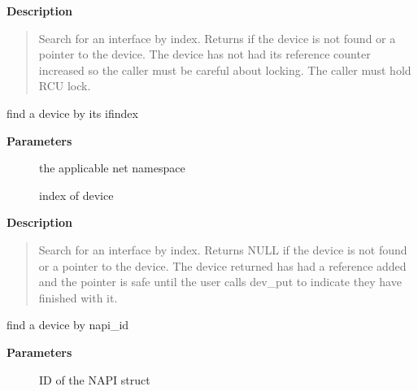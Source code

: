 \documentclass[a4paper,8pt,english]{sphinxmanual}
\begin{document}
\textbf{Description}
\begin{quote}

Search for an interface by index. Returns  if the device
is not found or a pointer to the device. The device has not
had its reference counter increased so the caller must be careful
about locking. The caller must hold RCU lock.
\end{quote}

\begin{fulllineitems}
\label{networking/kapi:c.dev_get_by_index}
find a device by its ifindex

\end{fulllineitems}


\textbf{Parameters}
\begin{description}
\item[{}] \leavevmode
the applicable net namespace

\item[{}] \leavevmode
index of device

\end{description}

\textbf{Description}
\begin{quote}

Search for an interface by index. Returns NULL if the device
is not found or a pointer to the device. The device returned has
had a reference added and the pointer is safe until the user calls
dev\_put to indicate they have finished with it.
\end{quote}

\begin{fulllineitems}
\label{networking/kapi:c.dev_get_by_napi_id}
find a device by napi\_id

\end{fulllineitems}


\textbf{Parameters}
\begin{description}
\item[{}] \leavevmode
ID of the NAPI struct

\end{description}
\end{document}
